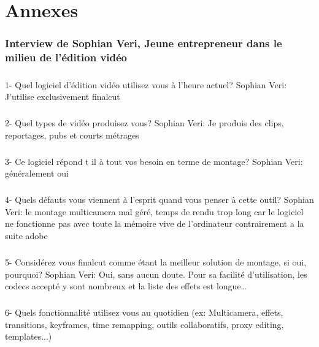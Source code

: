 \newpage
\chapter{Annexes}
\subsection {Interview de Sophian Veri,
Jeune entrepreneur dans le milieu de l'édition vidéo}

\paragraph{}
1-  Quel logiciel d'édition vidéo utilisez vous à l'heure actuel?
Sophian Veri: J'utilise exclusivement finalcut

\paragraph{}
2- Quel types de vidéo produisez vous?
Sophian Veri: Je produis des clips, reportages, pubs et courts métrages

\paragraph{}
3- Ce logiciel répond t il à tout vos besoin en terme de montage?
Sophian Veri: généralement oui

\paragraph{}
4- Quels défauts vous viennent à l'esprit quand vous penser à cette outil?
Sophian Veri: le montage multicamera mal géré, temps de rendu trop long car le
logiciel ne fonctionne pas avec toute la mémoire vive de l'ordinateur
contrairement a la suite adobe

\paragraph{}
5- Considérez vous finalcut comme étant la meilleur solution de montage,
si oui, pourquoi?
Sophian Veri: Oui, sans aucun doute. Pour sa facilité d'utilisation,
les codecs accepté y sont nombreux et la liste des effets est
longue\ldots

\paragraph{}
6-  Quels fonctionnalité utilisez vous au quotidien (ex: Multicamera, effets,
transitions, keyframes, time remapping, outils collaboratifs, proxy
editing, templates...)

